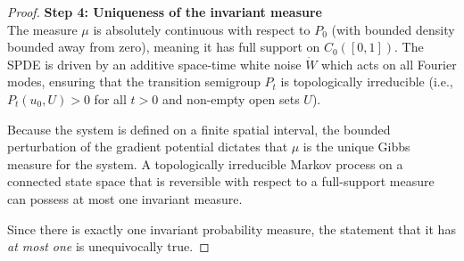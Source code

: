 \documentclass[12pt]{article}
\begin{document}
\begin{proof}
\medskip\noindent
\textbf{Step 4: Uniqueness of the invariant measure}\\
The measure $\mu$ is absolutely continuous with respect to $P_0$ (with bounded density bounded away from zero), meaning it has full support on $C_0([0,1])$. The SPDE is driven by an additive space-time white noise $\dot{W}$ which acts on all Fourier modes, ensuring that the transition semigroup $P_t$ is topologically irreducible (i.e., $P_t(u_0, U) > 0$ for all $t > 0$ and non-empty open sets $U$). 

Because the system is defined on a finite spatial interval, the bounded perturbation of the gradient potential dictates that $\mu$ is the unique Gibbs measure for the system. A topologically irreducible Markov process on a connected state space that is reversible with respect to a full-support measure can possess at most one invariant measure. 

Since there is exactly one invariant probability measure, the statement that it has \emph{at most one} is unequivocally true.
\end{proof}
\end{document}
